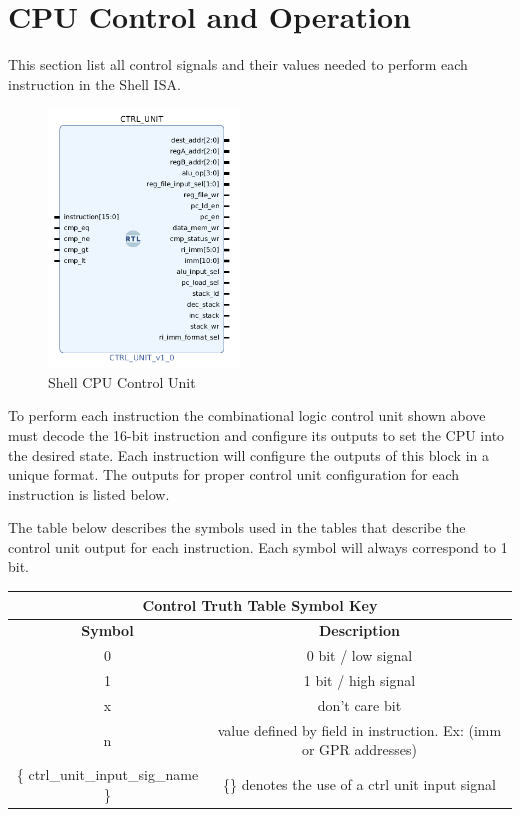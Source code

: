 \documentclass{article}
\begin{document}
\section{CPU Control and Operation}
\label{CPU_CTRL}
\begin{par}
	
	This section list all control signals and their values needed to perform each instruction in the Shell ISA. 

	\begin{figure}[H]
		\centering
		\includegraphics[width=2in]{img/ctrl_unit.png}
		\caption{Shell CPU Control Unit}
	\end{figure}

	To perform each instruction the combinational logic control unit shown above must decode the 16-bit instruction and configure its outputs to set the CPU into the desired state. Each instruction will configure the outputs of this block in a unique format. The outputs for proper control unit configuration for each instruction is listed below.
	
	\hspace{1pt}
	
	The table below describes the symbols used in the tables that describe the control unit output for each instruction. Each symbol will always correspond to 1 bit. 
	
	\begin{center}
		\begin{tabular}{|c|c|}
			\hline 
			\multicolumn{2}{|c|}{\textbf{Control Truth Table Symbol Key}} \\
			\hline 
			\textbf{Symbol} & \textbf{Description} \\ 
			\hline 
			0 & 0 bit / low signal \\ 
			\hline 
			1 & 1 bit / high signal \\ 
			\hline 
			x & don't care bit \\ 
			\hline 
			n & value defined by field in instruction. Ex: (imm or GPR addresses) \\ 
			\hline 
			\{ ctrl\_unit\_input\_sig\_name \} & \{\} denotes the use of a ctrl unit input signal \\ 
			\hline 
		\end{tabular} 
	\end{center}
	

\end{par}
\end{document}
